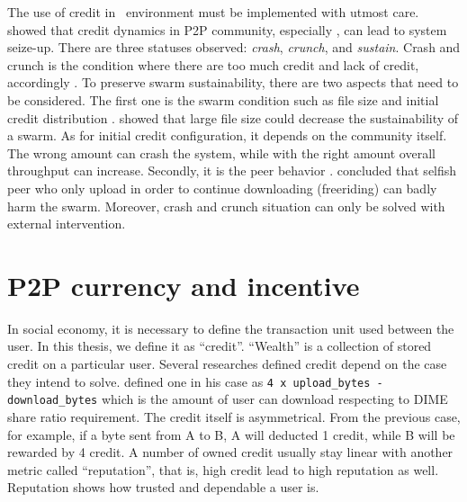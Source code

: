 
The use of credit in \bt~environment must be implemented with utmost care. \citeauthor{2010:crashsustain:rahman} showed that credit dynamics in P2P community, especially \bt, can lead to system seize-up. There are three statuses observed: \textit{crash}, \textit{crunch}, and \textit{sustain}. Crash and crunch is the condition where there are too much credit and lack of credit, accordingly \cite{2015:sustainabilitypt:vinko}. To preserve swarm sustainability, there are two aspects that need to be considered. The first one is the swarm condition such as file size and initial credit distribution \cite{2015:sustainabilitypt:vinko}. \citeauthor{2015:sustainabilitypt:vinko} showed that large file size could decrease the sustainability of a swarm. As for initial credit configuration, it depends on the community itself. The wrong amount can crash the system, while with the right amount overall throughput can increase. Secondly, it is the peer behavior \cite{2010:crashsustain:rahman}. \citeauthor{2010:crashsustain:rahman} concluded that selfish peer who only upload in order to continue downloading (freeriding) can badly harm the swarm. Moreover, crash and crunch situation can only be solved with external intervention.




\section{P2P currency and incentive}
In social economy, it is necessary to define the transaction unit used between the user. In this thesis, we define it as ``credit''. ``Wealth'' is a collection of stored credit on a particular user. Several researches defined credit depend on the case they intend to solve. \citeauthor{2012:economicbt:kash} defined one in his case as \texttt{4 x upload\_bytes - download\_bytes} which is the amount of user can download respecting to DIME share ratio requirement. The credit itself is asymmetrical. From the previous case, for example, if a byte sent from A to B, A will deducted 1 credit, while B will be rewarded by 4 credit. A number of owned credit usually stay linear with another metric called ``reputation'', that is, high credit lead to high reputation as well. Reputation shows how trusted and dependable a user is. 


